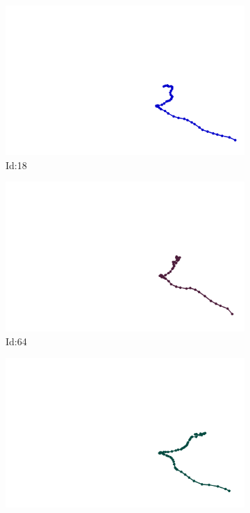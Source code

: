 \documentclass[12pt,twoside]{report}
\begin{document}
\begin{figure}
\centering
\begin{subfigure}[b]{0.20\textwidth}
\centering
\includegraphics[width=\textwidth]{../../trajectories/18.png}
\caption{Id:18}
\end{subfigure}
\begin{subfigure}[b]{0.20\textwidth}
\centering
\includegraphics[width=\textwidth]{../../trajectories/64.png}
\caption{Id:64}
\end{subfigure}
\begin{subfigure}[b]{0.20\textwidth}
\centering
\includegraphics[width=\textwidth]{../../trajectories/101.png}

\end{subfigure}
\end{figure}
\end{document}
